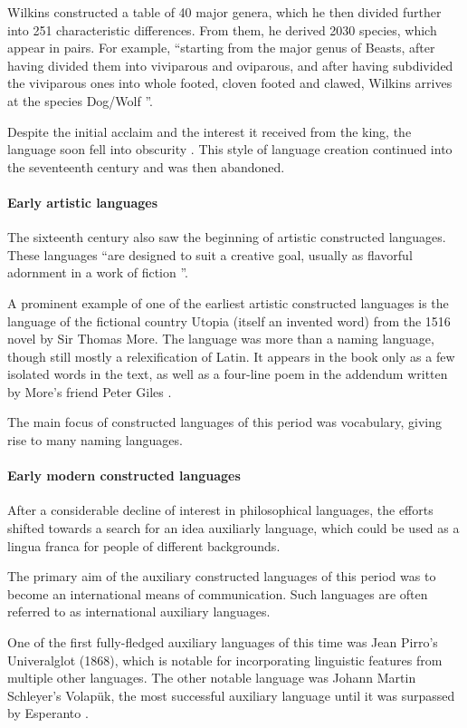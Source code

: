 \documentclass[14pt, a4paper]{extreport}
\begin{document}
Wilkins constructed a table of 40 major genera, which he then divided further into 251 characteristic differences. From them, he derived 2030 species, which appear in pairs. For example, ``starting from the major genus of Beasts, after having divided them into viviparous and oviparous, and after having subdivided the viviparous ones into whole footed, cloven footed and clawed, Wilkins arrives at the species Dog/Wolf \parencite[239]{eco}''.

Despite the initial acclaim and the interest it received from the king, the language soon fell into obscurity \parencite[25]{okrent}. This style of language creation continued into the seventeenth century and was then abandoned.
        \paragraph{Early artistic languages}
The sixteenth century also saw the beginning of artistic constructed languages. These languages ``are designed to suit a creative goal, usually as flavorful adornment in a work of fiction \parencite{sanders}''.

A prominent example of one of the earliest artistic constructed languages is the language of the fictional country Utopia (itself an invented word) from the 1516 novel by Sir Thomas More. The language was more than a naming language, though still mostly a relexification of Latin. It appears in the book only as a few isolated words in the text, as well as a four-line poem in the addendum written by More's friend Peter Giles \parencite{sanders}.

The main focus of constructed languages of this period was vocabulary, giving rise to many naming languages.
        \paragraph{Early modern constructed languages}
After a considerable decline of interest in philosophical languages, the efforts shifted towards a search for an idea auxiliarly language, which could be used as a lingua franca for people of different backgrounds.

The primary aim of the auxiliary constructed languages of this period was to become an international means of communication. Such languages are often referred to as international auxiliary languages.

One of the first fully-fledged auxiliary languages of this time was Jean Pirro's Univeralglot (1868), which is notable for incorporating linguistic features from multiple other languages. The other notable language was Johann Martin Schleyer's Volapük, the most successful auxiliary language until it was surpassed by Esperanto \parencite{sanders}.
\end{document}
